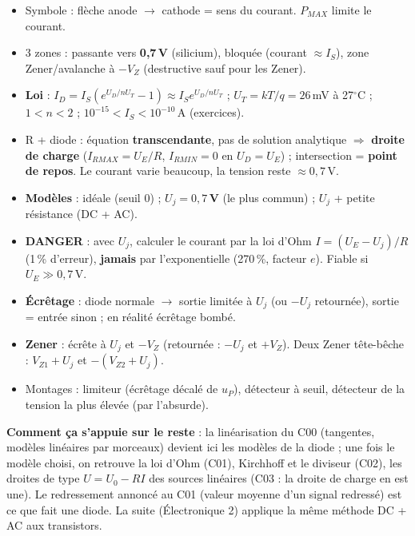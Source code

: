 \begin{recapbox}[title={Récap pour l'examen --- C07 : Diodes}]
\begin{itemize}
  \item Symbole : flèche anode $\to$ cathode = sens du courant. $P_{MAX}$ limite le courant.
  \item 3 zones : passante vers \textbf{0,7\,V} (silicium), bloquée (courant $\approx I_S$),
        zone Zener/avalanche à $-V_Z$ (destructive sauf pour les Zener).
  \item \textbf{Loi} : $I_D = I_S(e^{U_D/nU_T} - 1)\approx I_S e^{U_D/nU_T}$ ;
        $U_T = kT/q = 26$\,mV à 27\ensuremath{^\circ}C ; $1<n<2$ ; $10^{-15} < I_S < 10^{-10}$\,A (exercices).
  \item R + diode : équation \textbf{transcendante}, pas de solution analytique $\Rightarrow$
        \textbf{droite de charge} ($I_{RMAX} = U_E/R$, $I_{RMIN} = 0$ en $U_D = U_E$) ;
        intersection = \textbf{point de repos}. Le courant varie beaucoup, la tension reste
        $\approx0{,}7$\,V.
  \item \textbf{Modèles} : idéale (seuil 0) ; \textbf{$U_j = 0{,}7$\,V} (le plus commun) ;
        $U_j$ + petite résistance (DC + AC).
  \item \textbf{DANGER} : avec $U_j$, calculer le courant par la loi d'Ohm
        $I = (U_E - U_j)/R$ (1\,\% d'erreur), \textbf{jamais} par l'exponentielle (270\,\%,
        facteur $e$). Fiable si $U_E\gg0{,}7$\,V.
  \item \textbf{Écrêtage} : diode normale $\to$ sortie limitée à $U_j$ (ou $-U_j$ retournée),
        sortie = entrée sinon ; en réalité écrêtage bombé.
  \item \textbf{Zener} : écrête à $U_j$ et $-V_Z$ (retournée : $-U_j$ et $+V_Z$). Deux Zener
        tête-bêche : $V_{Z1} + U_j$ et $-(V_{Z2} + U_j)$.
  \item Montages : limiteur (écrêtage décalé de $u_P$), détecteur à seuil, détecteur de la
        tension la plus élevée (par l'absurde).
\end{itemize}
\textbf{Comment ça s'appuie sur le reste} : la linéarisation du C00 (tangentes, modèles
linéaires par morceaux) devient ici les modèles de la diode ; une fois le modèle choisi, on
retrouve la loi d'Ohm (C01), Kirchhoff et le diviseur (C02), les droites de type
$U = U_0 - RI$ des sources linéaires (C03 : la droite de charge en est une). Le redressement
annoncé au C01 (valeur moyenne d'un signal redressé) est ce que fait une diode. La suite
(Électronique 2) applique la même méthode DC + AC aux transistors.
\end{recapbox}
